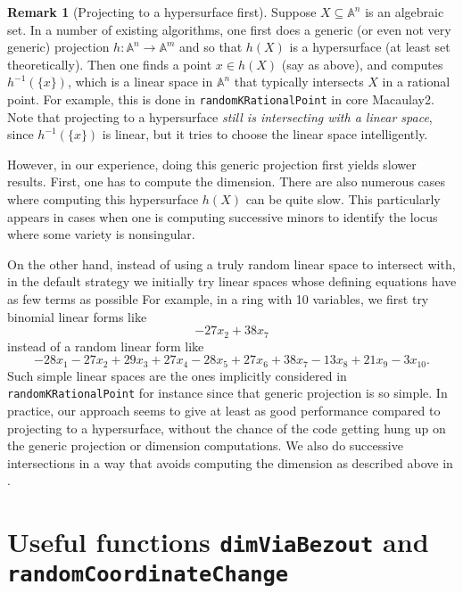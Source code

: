 \documentclass[11pt]{amsart}
\theoremstyle{definition}
\newtheorem{remark}{Remark}[subsection]
\newcommand{\bA}{\mathbb{A}}
\begin{document}
\begin{remark}[Projecting to a hypersurface first]
    \label{rem.ProjectingToAHypersurfaceFirst}
    Suppose $X \subseteq \bA^n$ is an algebraic set.  In a number of existing algorithms, one first does a generic (or even not very generic) projection $h : \bA^n \to \bA^m$ and so that $h(X)$ is a hypersurface (at least set theoretically).  Then one finds a point $x \in h(X)$ (say as above), and computes $h^{-1}(\{ x \})$, which is a linear space in $\bA^n$ that typically intersects $X$ in a rational point.   For example, this is done in {\tt randomKRationalPoint} in core Macaulay2.  Note that projecting to a hypersurface \emph{still is intersecting with a linear space}, since $h^{-1}(\{ x \})$ is linear, but it tries to choose the linear space intelligently.

    However, in our experience, doing this generic projection first yields slower results. First, one has to compute the dimension.  There are also numerous cases where computing this hypersurface $h(X)$ can be quite slow.  This particularly appears in cases when one is computing successive minors to identify the locus where some variety is nonsingular.  

    On the other hand, instead of using a truly random linear space to intersect with, in the default strategy we initially try linear spaces  whose defining equations have as few
    terms as possible   For example, in a ring with 10 variables, we first try binomial linear forms like
    \[ 
        -27 x_2 + 38 x_7
    \]
        instead of a random linear form like
    \[
        -28x_1-27x_2+29x_3+27x_4-28x_5+27x_6+38x_7-13x_8+21x_9-3x_{10}.
    \]
    Such simple linear spaces are the ones implicitly considered in {\tt randomKRationalPoint} for instance since that generic projection is so simple.  In practice, our approach seems to give at least as good performance compared to projecting to a hypersurface, without the chance of the code getting hung up on the generic projection or dimension computations.  We also do successive intersections in a way that avoids computing the dimension as described above in .
\end{remark}


\section{Useful functions {\tt dimViaBezout} and {\tt randomCoordinateChange}}{\label{helper}}
\end{document}
